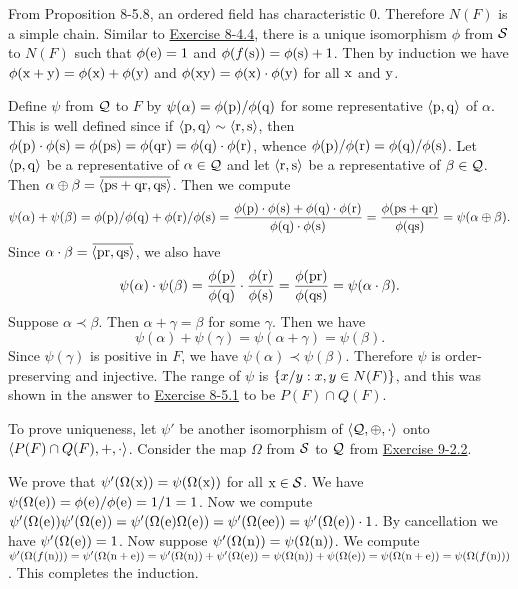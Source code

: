 \begin{solution}
From Proposition 8-5.8, an ordered field has characteristic 0. Therefore $N(F)$ is a simple chain.
Similar to \hyperref[ex:8-4.4]{Exercise 8-4.4}, there is a unique isomorphism $\phi$ from $\mathcal{S}$
to $N(F)$ such that
$\phi(\mathrm{e})=1$ and $\phi(f(\mathrm{s}))=\phi(\mathrm{s}) + 1$. Then by induction we have
$\phi(\mathrm{x} + \mathrm{y}) = \phi(\mathrm{x}) + \phi(\mathrm{y})$ and
$\phi(\mathrm{x} \mathrm{y}) = \phi(\mathrm{x})\cdot\phi(\mathrm{y})$ for all $\mathrm{x}$ and $\mathrm{y}$.

Define $\psi$ from $\mathcal{Q}$ to $F$ by $\psi(\alpha)=\phi(\mathrm{p})/\phi(\mathrm{q})$ for some
representative $\left\langle\mathrm{p},\mathrm{q}\right\rangle$ of $\alpha$. This is well defined since if
$\left\langle\mathrm{p},\mathrm{q}\right\rangle\sim \left\langle\mathrm{r},\mathrm{s}\right\rangle$, then
$\phi(\mathrm{p})\cdot \phi(\mathrm{s})=\phi(\mathrm{p}\mathrm{s})=\phi(\mathrm{q}\mathrm{r})=\phi(\mathrm{q})\cdot \phi(\mathrm{r})$,
whence $\phi(\mathrm{p})/\phi(\mathrm{r})=\phi(\mathrm{q})/\phi(\mathrm{s})$.
Let $\left\langle\mathrm{p},\mathrm{q}\right\rangle$ be a representative of $\alpha\in\mathcal{Q}$ and let
$\left\langle\mathrm{r},\mathrm{s}\right\rangle$ be a representative of $\beta\in\mathcal{Q}$.
Then $\alpha\oplus\beta=\overbar{\aprn{\mrm p\mrm s + \mrm q\mrm r, \mrm q\mrm s}}$.
Then we compute
\[
\psi(\alpha)+\psi(\beta)=\phi(\mathrm{p})/\phi(\mathrm{q}) + \phi(\mathrm{r})/\phi(\mathrm{s})
=\frac{\phi(\mathrm{p})\cdot \phi(\mathrm{s})+\phi(\mathrm{q})\cdot \phi(\mathrm{r})}{\phi(\mathrm{q})\cdot \phi(\mathrm{s})}
=\frac{\phi(\mathrm{p}\mathrm{s} + \mathrm{q}\mathrm{r})}{\phi(\mathrm{q}\mathrm{s})}
=\psi(\alpha\oplus\beta).
\]
Since $\alpha\cdot\beta=\overbar{\aprn{\mrm p\mrm r, \mrm q\mrm s}}$, we also have
\[\psi(\alpha)\cdot\psi(\beta)=\frac{\phi(\mathrm{p})}{\phi(\mathrm{q})}\cdot \frac{\phi(\mathrm{r})}{\phi(\mathrm{s})}
=\frac{\phi(\mathrm{p}\mathrm{r})}{\phi(\mathrm{q}\mathrm{s})}
=\psi(\alpha\cdot\beta).
\]
Suppose $\alpha\prec\beta$. Then $\alpha+\gamma=\beta$ for some $\gamma$. 
Then we have
\[\psi(\alpha)+\psi(\gamma)=\psi(\alpha+\gamma)=\psi(\beta).\]
Since $\psi(\gamma)$ is positive in $F$, we have $\psi(\alpha)\prec\psi(\beta)$.
Therefore $\psi$ is order-preserving and injective.
The range of $\psi$ is $\left\{ x/y : x,y\in N(F) \right\}$, and this was shown in the answer to
\hyperref[ex:8-5.1]{Exercise 8-5.1} to be $P(F)\cap Q(F)$.

To prove uniqueness, let $\psi'$ be another isomorphism of $\left\langle\mathcal{Q},\oplus,\cdot\right\rangle$ onto
$\left\langle P(F)\cap Q(F),+,\cdot\right\rangle$. Consider the map $\Omega$ from $\mathcal{S}$ to $\mathcal{Q}$
from \hyperref[ex:9-2.2]{Exercise 9-2.2}.

We prove that $\psi'(\Omega(\mathrm{x}))=\psi(\Omega(\mathrm{x}))$ for all $\mathrm{x}\in\mathcal{S}$.
We have $\psi(\Omega(\mathrm{e}))=\phi(\mathrm{e})/\phi(\mathrm{e})=1/1=1$.
Now we compute $\psi'(\Omega(\mathrm{e}))\psi'(\Omega(\mathrm{e}))=\psi'(\Omega(\mathrm{e})\Omega(\mathrm{e}))
=\psi'(\Omega(\mathrm{e}\mathrm{e}))=\psi'(\Omega(\mathrm{e}))\cdot 1$. By cancellation we have
$\psi'(\Omega(\mathrm{e}))=1$.
Now suppose $\psi'(\Omega(\mathrm{n}))=\psi(\Omega(\mathrm{n}))$.
We compute $
\psi'(\Omega(f(\mathrm{n})))=\psi'(\Omega(\mathrm{n}+\mathrm{e}))=\psi'(\Omega(\mathrm{n}))+\psi'(\Omega(\mathrm{e}))
=\psi(\Omega(\mathrm{n}))+\psi(\Omega(\mathrm{e}))
=\psi(\Omega(\mathrm{n}+\mathrm{e}))=\psi(\Omega(f(\mathrm{n})))$.
This completes the induction.


\end{solution}
